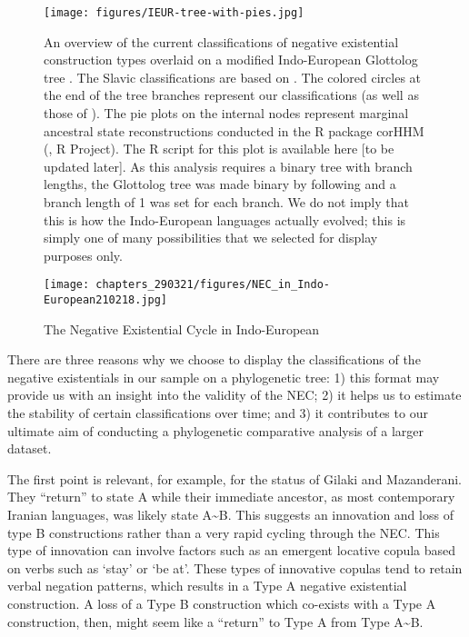 \documentclass[output=paper]{langsci/langscibook}
\begin{document}
\begin{figure}
\caption{An overview of the current classifications of negative existential
construction types overlaid on a modified Indo-European Glottolog tree
\citep{HammarstromBank2018-ieur}. The Slavic classifications are based on
\citet{Veselinova2014}. The colored circles at the end of the tree branches
represent our classifications (as well as those of
\citealt{Veselinova2014}). The pie plots on the internal nodes represent
marginal ancestral state reconstructions conducted in the R package corHHM
(\citealt{Beaulieu2014}, R Project\nocite{RDev2008}). The R script for this plot is
available here [to be updated later]. As this analysis requires a binary
tree with branch lengths, the Glottolog tree was made binary by following
\citet{BouckaertLemey2012} and a branch length of 1 was set for each branch. We do not imply that this is how the Indo-European languages actually evolved; this is simply one of many possibilities that we selected for display purposes only.} 
\label{fig:ieur-tree}
\texttt{[image: figures/IEUR-tree-with-pies.jpg]}
\end{figure}

\begin{figure}
\caption{The Negative Existential Cycle in Indo-European}
\label{fig:ieur-map}
\texttt{[image: chapters\_290321/figures/NEC\_in\_Indo-European210218.jpg]}
\end{figure}

There are three reasons why we choose to display the classifications of the negative existentials in our sample on a phylogenetic tree: 1) this format may provide us with an insight into the validity of the NEC; 2) it helps us to estimate the stability of certain classifications over time; and 3) it contributes to our ultimate aim of conducting a phylogenetic comparative analysis of a larger dataset. 

The first point is relevant, for example, for the status of Gilaki and
Mazanderani. They ``return'' to state A while their immediate ancestor, as most contemporary Iranian languages, was likely state A{\textasciitilde}B. This suggests an innovation and loss of type B constructions rather than a very rapid cycling through the NEC. This type of innovation can involve factors such as an emergent locative copula based on verbs such as `stay' or `be at'. These types of innovative copulas tend to retain verbal negation patterns, which results in a Type A negative existential construction. A loss of a Type B construction which co-exists with a Type A construction, then, might seem like a “return” to Type A from Type A{\textasciitilde}B. 
\end{document}
